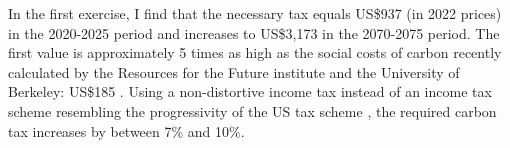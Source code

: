  In the first exercise, I find that the necessary tax equals US\$937 (in 2022 prices) in the 2020-2025 period and increases to US\$3,173 in the 2070-2075 period. The first value is approximately 5 times as high as the social costs of carbon recently calculated by the Resources for the Future institute and the University of Berkeley: US\$185 \citep{RFF}.
 Using a non-distortive income tax instead of an income tax scheme resembling the progressivity of the US tax scheme \citep[taken from][]{Heathcote2017OptimalFramework},  the required carbon tax increases by between 7\% and 10\%. %

